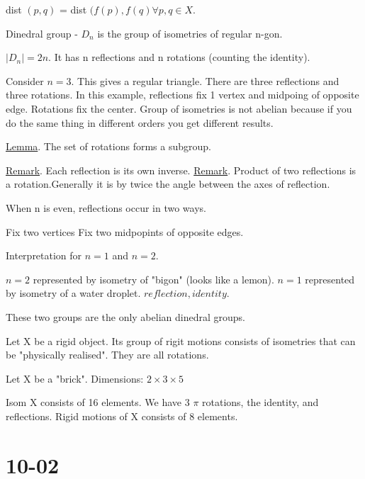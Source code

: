 \documentclass[11pt]{scrartcl}
\begin{document}
dist $(p, q)$ = dist $(f(p), f(q) \forall p, q \in X$.

\begin{definition}
  Dinedral group - $D_n$ is the group of isometries of regular n-gon.
  \begin{example}
    $|D_n| = 2n$. It has n reflections and n rotations (counting the identity).

    Consider $n = 3$. This gives a regular triangle. There are three reflections and three rotations. In this example, reflections fix 1 vertex and midpoing of opposite edge. Rotations fix the center. Group of isometries is not abelian because if you do the same thing in different orders you get different results.
  \end{example}
\end{definition}

\ul{Lemma}. The set of rotations forms a subgroup.

\ul{Remark}. Each reflection is its own inverse.
\ul{Remark}. Product of two reflections is a rotation.Generally it is by twice the angle between the axes of reflection.

When n is even, reflections occur in two ways.
\begin{enumerate}
  \ii
  Fix two vertices
  \ii
  Fix two midpopints of opposite edges.
\end{enumerate}

Interpretation for $n = 1$ and $n = 2$.
\begin{enumerate}
  \ii
  $n = 2$ represented by isometry of "bigon" (looks like a lemon). 
  \ii
  $n = 1$ represented by isometry of a water droplet. $reflection, identity$.
\end{enumerate}
These two groups are the only abelian dinedral groups.

Let X be a rigid object. Its group of rigit motions consists of isometries that can be "physically realised". They are all rotations.

\begin{example}
  Let X be a "brick". Dimensions: $2 \times 3 \times 5$
  \begin{enumerate}
    \ii
    Isom X consists of 16 elements. We have 3 $\pi$ rotations, the identity, and reflections.
    \ii
    Rigid motions of X consists of 8 elements.
  \end{enumerate}
\end{example}

\section{10-02}
\end{document}

